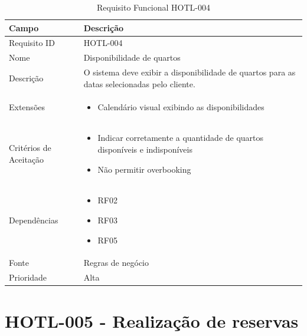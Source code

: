 \documentclass[
    12pt,
    oneside,
    a4paper,
    brazil
]{abntex2}
\begin{document}
\begin{table}[h]
	\begin{tabular}{|l|p{10cm}|}
		\hline
		\textbf{Campo} & \textbf{Descrição} \\
		\hline
		Requisito ID & HOTL-004 \\
		\hline
		Nome & Disponibilidade de quartos\\
		\hline
		Descrição & O sistema deve exibir a disponibilidade de quartos para as datas selecionadas pelo cliente. \\
		\hline
		Extensões & \begin{itemize}[leftmargin=*, labelsep=0.5em, noitemsep, topsep=0pt]
		\item Calendário visual exibindo as disponibilidades
		\end{itemize} \\
		\hline
		Critérios de Aceitação & \begin{itemize}[leftmargin=*, labelsep=0.5em, noitemsep, topsep=0pt]
		\item Indicar corretamente a quantidade de quartos disponíveis e indisponíveis
		\item Não permitir overbooking
		\end{itemize} \\
		\hline
		Dependências & \begin{itemize}[leftmargin=*, labelsep=0.5em, noitemsep, topsep=0pt] 
		\item RF02 
		\item RF03
		\item RF05
		\end{itemize} \\
		\hline
		Fonte & Regras de negócio \\
		\hline
		Prioridade & Alta \\
		\hline
	\end{tabular}
	\caption{Requisito Funcional HOTL-004}
\end{table}

\section{HOTL-005 - Realização de reservas}
\end{document}
